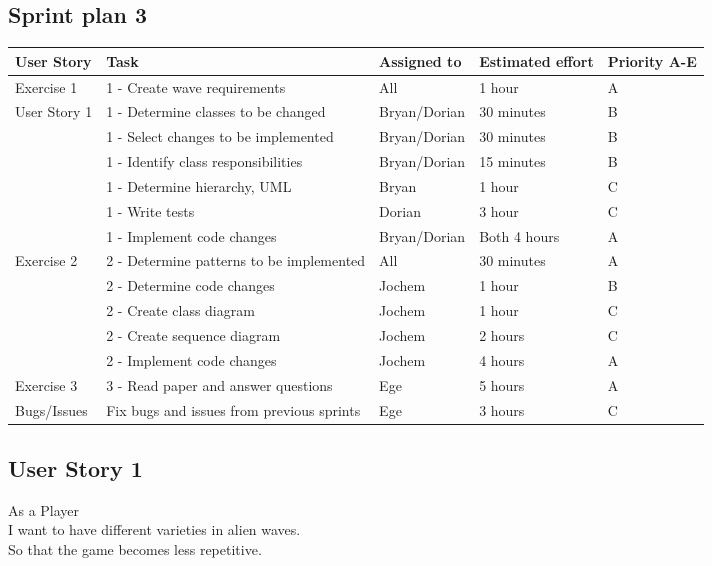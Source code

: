 \documentclass[10pt]{article}
\begin{document}
\begin{center}

\section*{Sprint plan 3}

    \hspace*{-3cm}\begin{tabular}{ | p{2cm} | p{9cm} | p{2.1cm} | p{2cm} | p{2cm} |}
    \hline
    User Story & Task & Assigned to & Estimated effort & Priority A-E \\ \hline
    Exercise 1 & 1 - Create wave requirements & All & 1 hour & A\\ 
    User Story 1 & 1 - Determine classes to be changed & Bryan/Dorian & 30 minutes & B\\ 
    & 1 - Select changes to be implemented & Bryan/Dorian & 30 minutes & B\\ 
    & 1 - Identify class responsibilities & Bryan/Dorian & 15 minutes & B\\ 
    & 1 - Determine hierarchy, UML & Bryan & 1 hour & C\\ 
    & 1 - Write tests & Dorian & 3 hour & C\\
    & 1 - Implement code changes & Bryan/Dorian & Both 4 hours & A\\ \hline
    Exercise 2 & 2 - Determine patterns to be implemented & All & 30 minutes & A\\ 
    & 2 - Determine code changes & Jochem & 1 hour & B\\
    & 2 - Create class diagram & Jochem & 1 hour & C\\ 
    & 2 - Create sequence diagram & Jochem & 2 hours & C\\ 
    & 2 - Implement code changes & Jochem & 4 hours & A \\ \hline
    Exercise 3 & 3 - Read paper and answer questions & Ege & 5 hours & A\\ \hline
    Bugs/Issues & Fix bugs and issues from previous sprints & Ege & 3 hours & C\\ \hline
    \end{tabular}
    
\end{center}

\subsection*{User Story 1}
As a Player\\ 
\indent I want to have different varieties in alien waves.\\
So that the game becomes less repetitive. 
\end{document}
